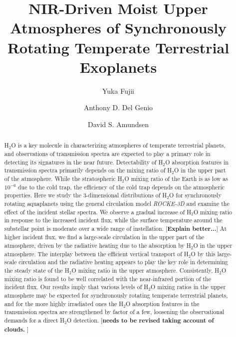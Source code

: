 \documentclass[11pt,numberedappendix,twocolappendix,]{emulateapj}
\def\water{H$_2$O }
\def\memo#1{\color{red}$[${\bf #1}$]$ \color{black}}
\begin{document}
\title{NIR-Driven Moist Upper Atmospheres of Synchronously Rotating Temperate Terrestrial Exoplanets}
\author{Yuka Fujii}
\author{Anthony D. Del Genio}
\author{David S. Amundsen}

\begin{abstract}

\water is a key molecule in characterizing atmospheres of temperate terrestrial planets, and observations of transmission spectra are expected to play a primary role in detecting its signatures in the near future. 
%
Detectability of \water absorption features in transmission spectra primarily depends on the mixing ratio of \water in the upper part of the atmosphere. 
%
While the stratospheric \water mixing ratio of the Earth is as low as $10^{-6}$ due to the cold trap, the efficiency of the cold trap depends on the atmospheric properties. 
%
Here we study the 3-dimensional distributions of \water for synchronously rotating aquaplanets using the general circulation model {\it ROCKE-3D} and examine the effect of the incident stellar spectra. 
%
We observe a gradual increase of \water mixing ratio in response to the increased incident flux, while the surface temperature around the substellar point is moderate over a wide range of instellation. \memo{Explain better...}
%
At higher incident flux, we find a large-scale circulation in the upper part of the atmosphere, driven by the radiative heating due to the absorption by \water in the upper atmosphere. 
%
The interplay between the efficient vertical transport of \water by this large-scale circulation and the radiative heating appears to play the key role in determining the steady state of the \water mixing ratio in the upper atmosphere.  
%
Consistently, \water mixing ratio is found to be well correlated with the near-infrared portion of the incident flux. 
%
Our results imply that various levels of \water mixing ratios in the upper atmosphere may be expected for synchronously rotating temperate terrestrial planets, and for the more highly irradiated ones the \water absorption features in the transmission spectra are strengthened by factor of a few, loosening the observational demands for a direct H$_2$O detection. \memo{needs to be revised taking account of clouds. }
%
\end{abstract}
\end{document}
